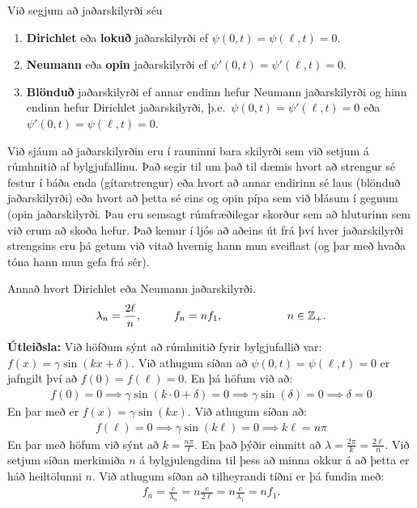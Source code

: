\ifdefined \wholebook \else\documentclass[oneside]{book}\usepackage{EdlBook}\graphicspath{{figures/}}
\begin{document}
\begin{tcolorbox}
\begin{definition}
Við segjum að jaðarskilyrði séu
\begin{enumerate}[label = \textbf{(\roman*)}]
    \item \textbf{Dirichlet} eða \textbf{lokuð} jaðarskilyrði ef $\psi(0,t) = \psi(\ell,t) = 0$.
    \item \textbf{Neumann} eða \textbf{opin} jaðarskilyrði ef $\psi'(0,t) = \psi'(\ell,t) = 0$.
    \item \textbf{Blönduð} jaðarskilyrði ef annar endinn hefur Neumann jaðarskilyrði og hinn endinn hefur Dirichlet jaðarskilyrði, þ.e.~$\psi(0,t) = \psi'(\ell,t) = 0$ eða $\psi'(0,t) = \psi(\ell,t) = 0$. 
\end{enumerate}
\end{definition}
\end{tcolorbox}

Við sjáum að jaðarskilyrðin eru í rauninni bara skilyrði sem við setjum á rúmhnitið af bylgjufallinu. Það segir til um það til dæmis hvort að strengur sé festur í báða enda (gítarstrengur) eða hvort að annar endirinn sé laus (blönduð jaðarskilyrði) eða hvort að þetta sé eins og opin pípa sem við blásum í gegnum (opin jaðarskilyrði. Þau eru semsagt rúmfræðilegar skorður sem að hluturinn sem við erum að skoða hefur. Það kemur í ljós að aðeins út frá því hver jaðarskilyrði strengsins eru þá getum við vitað hvernig hann mun sveiflast (og þar með hvaða tóna hann mun gefa frá sér).


\begin{tcolorbox}
\begin{theorem}
Annað hvort Dirichlet eða Neumann jaðarskilyrði.
\begin{align*}
    \lambda_n = \frac{2\ell}{n}, \hspace{1cm} f_n = nf_1, \hspace{2cm} n \in \mathbb{Z}_+.
\end{align*}
\end{theorem}
\end{tcolorbox}

\textbf{Útleiðsla:} Við höfðum sýnt að rúmhnitið fyrir bylgjufallið var: $f(x) = \gamma \sin(kx + \delta)$. Við athugum síðan að $\psi(0,t) = \psi(\ell,t) = 0$ er jafngilt því að $f(0) = f(\ell) = 0$. En þá höfum við að:
\begin{align*}
    f(0) = 0 \implies \gamma \sin(k\cdot 0 + \delta ) = 0 \implies \gamma \sin(\delta) = 0 \implies \delta = 0
\end{align*}
En þar með er $f(x) = \gamma \sin(kx)$. Við athugum síðan að:
\begin{align*}
    f(\ell) = 0 \implies \gamma \sin(k\ell) = 0 \implies k\ell = n\pi
\end{align*}
En þar með höfum við sýnt að $k = \frac{n\pi}{\ell}$. En það þýðir einmitt að $\lambda = \frac{2\pi}{k} = \frac{2\ell}{n}$. Við setjum síðan merkimiða $n$ á bylgjulengdina til þess að minna okkur á að þetta er háð heiltölunni $n$. Við athugum síðan að tilheyrandi tíðni er þá fundin með:
\begin{align*}
    f_n = \frac{c}{\lambda_n} = n \frac{c}{2\ell} = n \frac{c}{\lambda_1} = nf_1.
\end{align*}
\end{document}

